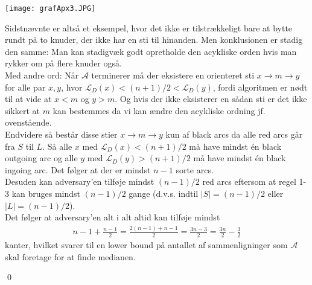 \begin{center}
	\texttt{[image: grafApx3.JPG]}
\end{center}

Sidstnævnte er altså et eksempel, hvor det ikke er tilstrækkeligt bare at bytte rundt på to knuder, der ikke har en sti til hinanden. Men konklusionen er stadig den samme: Man kan stadigvæk godt opretholde den acykliske orden hvis man rykker om på flere knuder også. \\

Med andre ord: Når $\mathcal{A}$ terminerer må der eksistere en orienteret sti $x \rightarrow m \rightarrow y$ for alle par $x,y$, hvor $\mathcal{L}_D(x)<(n+1)/2<\mathcal{L}_D(y)$, fordi algoritmen er nødt til at vide at $x<m$ og $y>m$. Og hvis der ikke eksisterer en sådan sti er det ikke sikkert at $m$ kan bestemmes da vi kan ændre den acykliske ordning jf. ovenstående. \\

Endvidere så består disse stier $x \rightarrow m \rightarrow y$ kun af black arcs da alle red arcs går fra $S$ til $L$. Så alle $x$ med $\mathcal{L}_D(x)<(n+1)/2$ må have mindst én black outgoing arc og alle $y$ med $\mathcal{L}_D(y)>(n+1)/2$ må have mindst én black ingoing arc. Det følger at der er mindst $n-1$ sorte arcs. \\

Desuden kan adversary'en tilføje mindst $(n-1)/2$ red arcs eftersom at regel 1-3 kan bruges mindst $(n-1)/2$ gange (d.v.s. indtil $|S|=(n-1)/2$ eller $|L|=(n-1)/2$). \\

Det følger at adversary'en alt i alt altid kan tilføje mindst 
\begin{align*}
n-1 +\frac{n-1}{2} = \frac{2(n-1)+n-1}{2}=\frac{3n-3}{2}=\frac{3n}{2}-\frac{3}{2}
\end{align*}
kanter, hvilket svarer til en lower bound på antallet af sammenligninger som $\mathcal{A}$ skal foretage for at finde medianen. 
\begin{flushright}
	\qed
\end{flushright}
